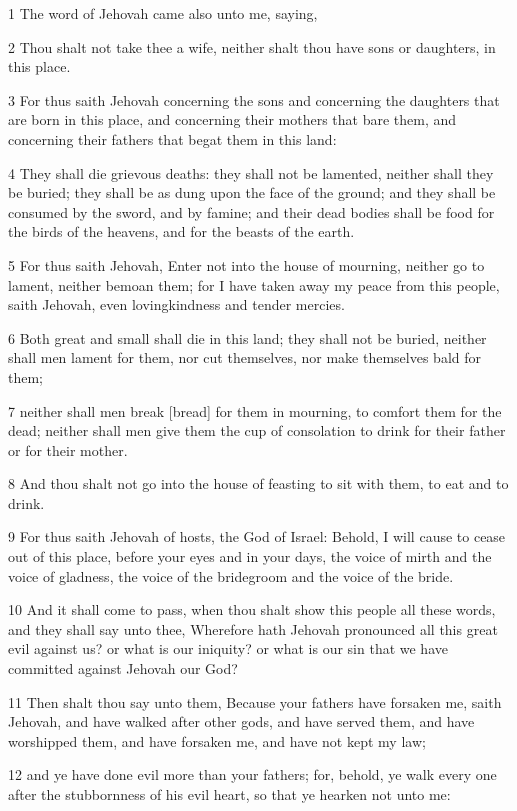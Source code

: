 \par 1 The word of Jehovah came also unto me, saying,
\par 2 Thou shalt not take thee a wife, neither shalt thou have sons or daughters, in this place.
\par 3 For thus saith Jehovah concerning the sons and concerning the daughters that are born in this place, and concerning their mothers that bare them, and concerning their fathers that begat them in this land:
\par 4 They shall die grievous deaths: they shall not be lamented, neither shall they be buried; they shall be as dung upon the face of the ground; and they shall be consumed by the sword, and by famine; and their dead bodies shall be food for the birds of the heavens, and for the beasts of the earth.
\par 5 For thus saith Jehovah, Enter not into the house of mourning, neither go to lament, neither bemoan them; for I have taken away my peace from this people, saith Jehovah, even lovingkindness and tender mercies.
\par 6 Both great and small shall die in this land; they shall not be buried, neither shall men lament for them, nor cut themselves, nor make themselves bald for them;
\par 7 neither shall men break [bread] for them in mourning, to comfort them for the dead; neither shall men give them the cup of consolation to drink for their father or for their mother.
\par 8 And thou shalt not go into the house of feasting to sit with them, to eat and to drink.
\par 9 For thus saith Jehovah of hosts, the God of Israel: Behold, I will cause to cease out of this place, before your eyes and in your days, the voice of mirth and the voice of gladness, the voice of the bridegroom and the voice of the bride.
\par 10 And it shall come to pass, when thou shalt show this people all these words, and they shall say unto thee, Wherefore hath Jehovah pronounced all this great evil against us? or what is our iniquity? or what is our sin that we have committed against Jehovah our God?
\par 11 Then shalt thou say unto them, Because your fathers have forsaken me, saith Jehovah, and have walked after other gods, and have served them, and have worshipped them, and have forsaken me, and have not kept my law;
\par 12 and ye have done evil more than your fathers; for, behold, ye walk every one after the stubbornness of his evil heart, so that ye hearken not unto me:
